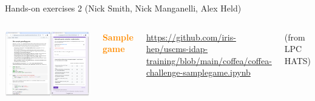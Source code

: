 \documentclass[aspectratio=169]{beamer}
\begin{document}
\begin{frame}{Hands-on exercises 2 (Nick Smith, Nick Manganelli, Alex Held)}
\vspace{0.25 cm}
\large
\begin{columns}
\includegraphics[width=\linewidth]{PLOTS/sample-guessing-game.png}

\textcolor{darkorange}{\bf Sample game}

\tiny
\vspace{0.2 cm}
\textcolor{blue}{\href{https://github.com/iris-hep/uscms-idap-training/blob/main/coffea/coffea-challenge-samplegame.ipynb}{https://github.com/iris-hep/uscms-idap-training/blob/main/coffea/coffea-challenge-samplegame.ipynb}}

\scriptsize
\vspace{0.1 cm}
(from LPC HATS)

\small
\vspace{0.225 cm}

\vspace{0.225 cm}

\vspace{0.225 cm}

\vspace{0.225 cm}
\end{columns}
\end{frame}
\end{document}
